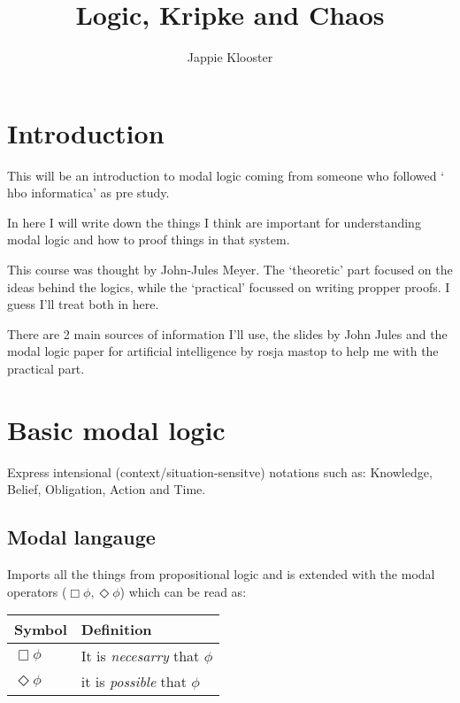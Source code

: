 \documentclass{article}
\begin{document}
\lstset{language=Java}
\author{Jappie Klooster}
\title{Logic, Kripke and Chaos}
\maketitle

\section{Introduction}
This will be an introduction to modal logic coming from someone who followed
` hbo informatica' as pre study.

In here I will write down the things I think are important for understanding
modal logic and how to proof things in that system.


This course was thought by John-Jules Meyer. The `theoretic' part focused
on the ideas behind the logics, while the `practical' focussed on writing
propper proofs. I guess I'll treat both in here.

There are 2 main sources of information I'll use, the slides by John Jules
and the modal logic paper for artificial intelligence by rosja mastop to help
me with the practical part. 

\section{Basic modal logic}
Express intensional (context/situation-sensitve) notations such as: 
Knowledge, Belief, Obligation, Action and Time.

\subsection{Modal langauge}

Imports all the things from propositional logic and is extended
with the modal operators ($\Box\phi,\Diamond\phi$) which can be read as:

\begin{tabular}{ll}
	Symbol & Definition \\ \toprule
	$\Box\phi$ & It is \emph{necesarry} that $\phi$ \\
	$\Diamond\phi$ & it is \emph{possible} that $\phi$

\end{tabular}
\end{document}
